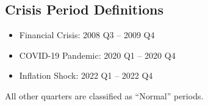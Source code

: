 \documentclass[11pt,letterpaper]{scrartcl}
\begin{document}
\subsection{Crisis Period Definitions}

\begin{itemize}
    \item Financial Crisis: 2008 Q3 -- 2009 Q4
    \item COVID-19 Pandemic: 2020 Q1 -- 2020 Q4
    \item Inflation Shock: 2022 Q1 -- 2022 Q4
\end{itemize}
All other quarters are classified as ``Normal'' periods.

\end{document}

